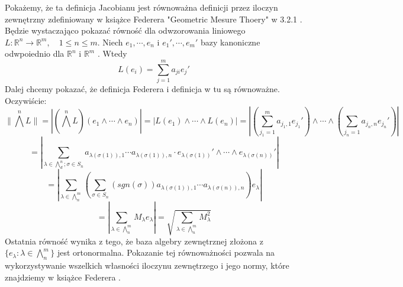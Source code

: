 \begin{lem}
	Pokażemy, że ta definicja Jacobianu jest równoważna definicji przez iloczyn zewnętrzny zdefiniowany w książce Federera "Geometric Mesure Thoery" w 3.2.1 \citep{Federer}. Będzie wystaczająco pokazać równość dla odwzorowania liniowego $L: \mathbb{R}^n \rightarrow \mathbb{R}^m, \quad 1 \leq n \leq m$. Niech $e_1, \cdots, e_n$ i $e_1', \cdots, e_m'$ bazy kanoniczne odwpoiednio dla $\mathbb{R}^n$ i $\mathbb{R}^m$ . Wtedy $$
		L(e_i) = \sum_{j=1}^m a_{ji} e_j'
	$$
	Dalej chcemy pokazać, że definicja Federera i definicja w tu są równoważne. Oczywiście:
	$$
		\| \bigwedge^n L \| = |(\bigwedge^n L) (e_1 \wedge \cdots \wedge e_n)| 
		= |L(e_1) \wedge \cdots \wedge L(e_n)| 
		= \left| (\sum^m_{j_1=1}a_{j_1, 1} e_{j_1}') \wedge \cdots \wedge (\sum_{j_n=1} a_{j_n, n} e_{j_n}') \right| 
	$$
	$$
		= \left| \sum_{\lambda \in \bigwedge^n_d; \sigma \in S_n} a_{\lambda(\sigma(1)), 1} \cdots a_{\lambda(\sigma(1)), n} 
			\cdot e_{\lambda(\sigma(1))}' \wedge \cdots \wedge e_{\lambda(\sigma(n))}'\right|
	$$
	$$
		= \left| \sum_{\lambda \in \bigwedge^m_n} \left( \sum_{\sigma \in S_n} (sgn(\sigma))a_{\lambda(\sigma(1)), 1} \cdots a_{\lambda(\sigma(n)), n} \right) e_{\lambda} \right|
	$$
	$$
		= \left| \sum_{\lambda \in \bigwedge_n^m} M_{\lambda} e_{\lambda} \right| = \sqrt{\sum_{\lambda \in \bigwedge_n^m} M_{\lambda}^2}
	$$
	Ostatnia równość wynika z tego, że baza algebry zewnętrznej złożona z $\{ e_{\lambda}: \lambda \in \bigwedge_n^m\}$ jest ortonormalna.\newline
	Pokazanie tej równoważności pozwala na wykorzystywanie wszelkich własności iloczynu zewnętrzego i jego normy, które znajdziemy w książce Federera \citep{Federer}.
\end{lem}